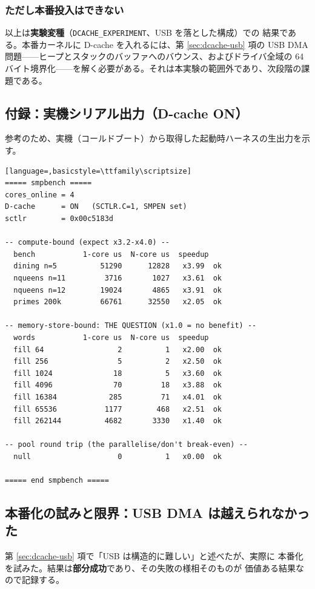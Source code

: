 \subsubsection*{ただし本番投入はできない}

以上は\textbf{実験変種}（\texttt{DCACHE\_EXPERIMENT}、USB を落とした構成）での
結果である。本番カーネルに D-cache を入れるには、第 \ref{sec:dcache-usb} 項の
USB DMA 問題——ヒープとスタックのバッファへのバウンス、およびドライバ全域の
64 バイト境界化——を解く必要がある。それは本実験の範囲外であり、次段階の課題である。

\subsection{付録：実機シリアル出力（D-cache ON）}

参考のため、実機（コールドブート）から取得した起動時ハーネスの生出力を示す。

\begin{lstlisting}[language=,basicstyle=\ttfamily\scriptsize]
===== smpbench =====
cores_online = 4
D-cache      = ON   (SCTLR.C=1, SMPEN set)
sctlr        = 0x00c5183d

-- compute-bound (expect x3.2-x4.0) --
  bench           1-core us  N-core us  speedup
  dining n=5          51290      12828   x3.99  ok
  nqueens n=11         3716       1027   x3.61  ok
  nqueens n=12        19024       4865   x3.91  ok
  primes 200k         66761      32550   x2.05  ok

-- memory-store-bound: THE QUESTION (x1.0 = no benefit) --
  words           1-core us  N-core us  speedup
  fill 64                 2          1   x2.00  ok
  fill 256                5          2   x2.50  ok
  fill 1024              18          5   x3.60  ok
  fill 4096              70         18   x3.88  ok
  fill 16384            285         71   x4.01  ok
  fill 65536           1177        468   x2.51  ok
  fill 262144          4682       3330   x1.40  ok

-- pool round trip (the parallelise/don't break-even) --
  null                    0          1   x0.00  ok

===== end smpbench =====
\end{lstlisting}
\subsection{本番化の試みと限界：USB DMA は越えられなかった}
\label{sec:dcache-prod}

第 \ref{sec:dcache-usb} 項で「USB は構造的に難しい」と述べたが、実際に
本番化を試みた。結果は\textbf{部分成功}であり、その失敗の様相そのものが
価値ある結果なので記録する。

